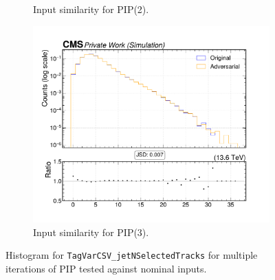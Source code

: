 \begin{figure}[htbp]
\begin{subfigure}[t]{0.32\textwidth}
    \caption{Input similarity for PIP(2).}
  \end{subfigure}\hfill
  \begin{subfigure}[t]{0.32\textwidth}
    \includegraphics[width=\linewidth]{media/output/features/compare/intprob_3/cmp_global_features_TagVarCSV_jetNSelectedTracks.pdf}
    \caption{Input similarity for PIP(3).}
  \end{subfigure}

  \caption{Histogram for \texttt{TagVarCSV\_jetNSelectedTracks} for multiple iterations of PIP tested against nominal inputs.}
  \label{fig:intprob_input_TagVarCSV_jetNSelectedTracks}
\end{figure}

